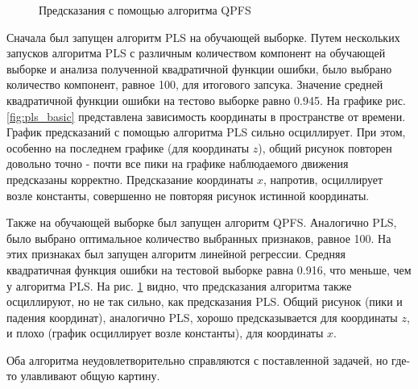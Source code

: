 \documentclass[12pt,twoside]{article}
\begin{document}
\begin{figure}[h]
\begin{minipage}[h]{0.49\linewidth}
\caption{Предсказания с помощью алгоритма QPFS}
\label{fig:qpfs_basic}
\end{minipage}
\end{figure}


Сначала был запущен алгоритм PLS на обучающей выборке. Путем нескольких запусков алгоритма PLS с различным количеством компонент на обучающей выборке и анализа полученной квадратичной функции ошибки, было выбрано количество компонент, равное 100, для итогового запсука. Значение средней квадратичной функции ошибки на тестово выборке равно 0.945. На графике рис. \ref{fig:pls_basic} представлена зависимость координаты в пространстве от времени. График предсказаний с помощью алгоритма PLS сильно осциллирует. При этом, особенно на последнем графике (для координаты $z$), общий рисунок повторен довольно точно - почти все пики на графике наблюдаемого движения предсказаны корректно. Предсказание координаты $x$, напротив, осциллирует возле константы, совершенно не повторяя рисунок истинной координаты. 

Также на обучающей выборке был запущен алгоритм QPFS. Аналогично PLS, было выбрано оптимальное количество выбранных признаков, равное 100. На этих признаках был запущен алгоритм линейной регрессии. Средняя квадратичная функция ошибки на тестовой выборке равна 0.916, что меньше, чем у алгоритма PLS. На рис. \ref{fig:qpfs_basic} видно, что предсказания алгоритма также осциллируют, но не так сильно, как предсказания PLS. Общий рисунок (пики и падения координат), аналогично PLS, хорошо предсказывается для координаты $z$, и плохо (график осциллирует возле константы), для координаты $x$. 

Оба алгоритма неудовлетворительно справляются с поставленной задачей, но где-то улавливают общую картину.



{}

\end{document}
